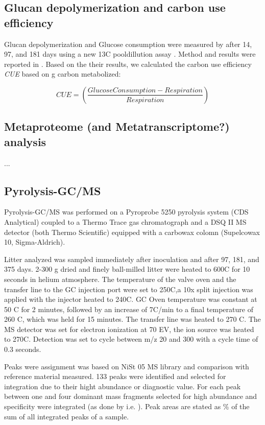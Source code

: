 \subsection{Glucan depolymerization and carbon use efficiency}
Glucan depolymerization and Glucose consumption were measured by \cite{Leitner2011} after 14, 97, and 181 days using a new 13C pooldillution assay . Method and results were reported in \cite{Leitner2011}. Based on the their results, we calculated the carbon use efficiency \emph{CUE} based on g carbon metabolized:

\begin{equation}
CUE = (\frac{Glucose Consumption - Respiration}{Respiration})
\end{equation}

\subsection{Metaproteome (and Metatranscriptome?) analysis}
...

\subsection{Pyrolysis-GC/MS}
Pyrolysis-GC/MS was performed on a Pyroprobe 5250 pyrolysis system (CDS Analytical) coupled to a Thermo Trace gas chromatograph and a DSQ II MS detector (both Thermo Scientific) equipped with a carbowax colomn (Supelcowax 10, Sigma-Aldrich).

Litter analyzed was sampled immediately after inoculation and after 97, 181, and 375 days. 2-300 \textmu g dried and finely ball-milled litter were heated to 600\textdegree C for 10 seconds in helium atmosphere. The temperature of the valve oven and the transfer line to the GC injection port were set to 250\textdegree C,a 10x split injection was applied with the injector heated to 240\textdegree C. GC Oven temperature was constant at 50 \textdegree C for 2 minutes, followed by an increase of 7\textdegree C/min to a final temperature of 260 \textdegree C, which was held for 15 minutes. The transfer line was heated to 270 \textdegree C. The MS detector was set for electron ionization at 70 EV, the ion source was heated to 270\textdegree C. Detection was set to cycle between m/z 20 and 300 with a cycle time of 0.3 seconds.

Peaks were assignment was based on NiSt 05 MS library and comparison with reference material measured. 133 peaks were identified and selected for integration due to their hight abundance or diagnostic value. For each peak between one and four dominant mass fragments selected for high abundance and specificity were integrated (as done by i.e. \cite{Schellekens2009}). Peak areas are stated as \% of the sum of all integrated peaks of a sample. 

